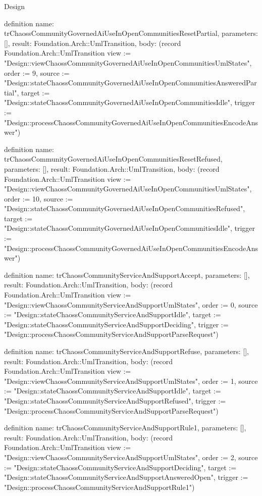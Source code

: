 \begin{lexlean}{Design}
\begin{semanticmodule}
definition{
  name: trChaossCommunityGovernedAiUseInOpenCommunitiesResetPartial,
  parameters: [],
  result: Foundation.Arch::UmlTransition,
  body: (record Foundation.Arch::UmlTransition {view := "Design::viewChaossCommunityGovernedAiUseInOpenCommunitiesUmlStates", order := 9, source := "Design::stateChaossCommunityGovernedAiUseInOpenCommunitiesAnsweredPartial", target := "Design::stateChaossCommunityGovernedAiUseInOpenCommunitiesIdle", trigger := "Design::processChaossCommunityGovernedAiUseInOpenCommunitiesEncodeAnswer"})
}

definition{
  name: trChaossCommunityGovernedAiUseInOpenCommunitiesResetRefused,
  parameters: [],
  result: Foundation.Arch::UmlTransition,
  body: (record Foundation.Arch::UmlTransition {view := "Design::viewChaossCommunityGovernedAiUseInOpenCommunitiesUmlStates", order := 10, source := "Design::stateChaossCommunityGovernedAiUseInOpenCommunitiesRefused", target := "Design::stateChaossCommunityGovernedAiUseInOpenCommunitiesIdle", trigger := "Design::processChaossCommunityGovernedAiUseInOpenCommunitiesEncodeAnswer"})
}

definition{
  name: trChaossCommunityServiceAndSupportAccept,
  parameters: [],
  result: Foundation.Arch::UmlTransition,
  body: (record Foundation.Arch::UmlTransition {view := "Design::viewChaossCommunityServiceAndSupportUmlStates", order := 0, source := "Design::stateChaossCommunityServiceAndSupportIdle", target := "Design::stateChaossCommunityServiceAndSupportDeciding", trigger := "Design::processChaossCommunityServiceAndSupportParseRequest"})
}

definition{
  name: trChaossCommunityServiceAndSupportRefuse,
  parameters: [],
  result: Foundation.Arch::UmlTransition,
  body: (record Foundation.Arch::UmlTransition {view := "Design::viewChaossCommunityServiceAndSupportUmlStates", order := 1, source := "Design::stateChaossCommunityServiceAndSupportIdle", target := "Design::stateChaossCommunityServiceAndSupportRefused", trigger := "Design::processChaossCommunityServiceAndSupportParseRequest"})
}

definition{
  name: trChaossCommunityServiceAndSupportRule1,
  parameters: [],
  result: Foundation.Arch::UmlTransition,
  body: (record Foundation.Arch::UmlTransition {view := "Design::viewChaossCommunityServiceAndSupportUmlStates", order := 2, source := "Design::stateChaossCommunityServiceAndSupportDeciding", target := "Design::stateChaossCommunityServiceAndSupportAnsweredOpen", trigger := "Design::processChaossCommunityServiceAndSupportRule1"})
}


\end{semanticmodule}
\end{lexlean}
